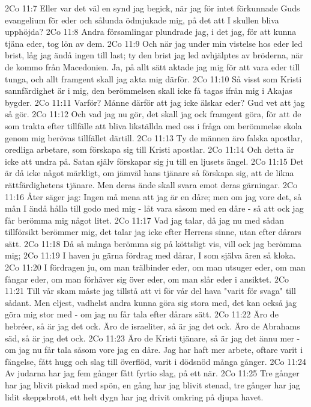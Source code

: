 2Co 11:7  Eller var det väl en synd jag begick, när jag för intet förkunnade Guds evangelium för eder och sålunda ödmjukade mig, på det att I skullen bliva upphöjda?
2Co 11:8  Andra församlingar plundrade jag, i det jag, för att kunna tjäna eder, tog lön av dem.
2Co 11:9  Och när jag under min vistelse hos eder led brist, låg jag ändå ingen till last; ty den brist jag led avhjälptes av bröderna, när de kommo från Macedonien. Ja, på allt sätt aktade jag mig för att vara eder till tunga, och allt framgent skall jag akta mig därför.
2Co 11:10  Så visst som Kristi sannfärdighet är i mig, den berömmelsen skall icke få tagas ifrån mig i Akajas bygder.
2Co 11:11  Varför? Månne därför att jag icke älskar eder? Gud vet att jag så gör.
2Co 11:12  Och vad jag nu gör, det skall jag ock framgent göra, för att de som trakta efter tillfälle att bliva likställda med oss i fråga om berömmelse skola genom mig berövas tillfället därtill.
2Co 11:13  Ty de männen äro falska apostlar, oredliga arbetare, som förskapa sig till Kristi apostlar.
2Co 11:14  Och detta är icke att undra på. Satan själv förskapar sig ju till en ljusets ängel.
2Co 11:15  Det är då icke något märkligt, om jämväl hans tjänare så förskapa sig, att de likna rättfärdighetens tjänare. Men deras ände skall svara emot deras gärningar.
2Co 11:16  Åter säger jag: Ingen må mena att jag är en dåre; men om jag vore det, så mån I ändå hålla till godo med mig - låt vara såsom med en dåre - så att ock jag får berömma mig något litet.
2Co 11:17  Vad jag talar, då jag nu med sådan tillförsikt berömmer mig, det talar jag icke efter Herrens sinne, utan efter dårars sätt.
2Co 11:18  Då så många berömma sig på köttsligt vis, vill ock jag berömma mig;
2Co 11:19  I haven ju gärna fördrag med dårar, I som själva ären så kloka.
2Co 11:20  I fördragen ju, om man trälbinder eder, om man utsuger eder, om man fångar eder, om man förhäver sig över eder, om man slår eder i ansiktet.
2Co 11:21  Till vår skam måste jag tillstå att vi för vår del hava "varit för svaga" till sådant. Men eljest, vadhelst andra kunna göra sig stora med, det kan också jag göra mig stor med - om jag nu får tala efter dårars sätt.
2Co 11:22  Äro de hebréer, så är jag det ock. Äro de israeliter, så är jag det ock. Äro de Abrahams säd, så är jag det ock.
2Co 11:23  Äro de Kristi tjänare, så är jag det ännu mer - om jag nu får tala såsom vore jag en dåre. Jag har haft mer arbete, oftare varit i fängelse, fått hugg och slag till överflöd, varit i dödsnöd många gånger.
2Co 11:24  Av judarna har jag fem gånger fått fyrtio slag, på ett när.
2Co 11:25  Tre gånger har jag blivit piskad med spön, en gång har jag blivit stenad, tre gånger har jag lidit skeppsbrott, ett helt dygn har jag drivit omkring på djupa havet.
